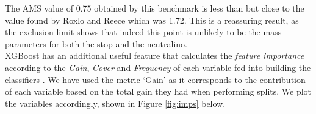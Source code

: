 The AMS value of 0.75 obtained by this benchmark is less than but close to the value found by Roxlo and Reece \cite{roxlo2018opening} which was 1.72. This is a reassuring result, as the exclusion limit shows that indeed this point is unlikely to be the mass parameters for both the stop and the neutralino. \\

XGBoost has an additional useful feature that calculates the \textit{feature importance} according to the \textit{Gain}, \textit{Cover} and \textit{Frequency} of each variable fed into building the classifiers \cite{xgboost}. We have used the metric `Gain' as it corresponds to the contribution of each variable based on the total gain they had when performing splits. We plot the variables accordingly, shown in Figure \ref{fig:imps} below. \\

